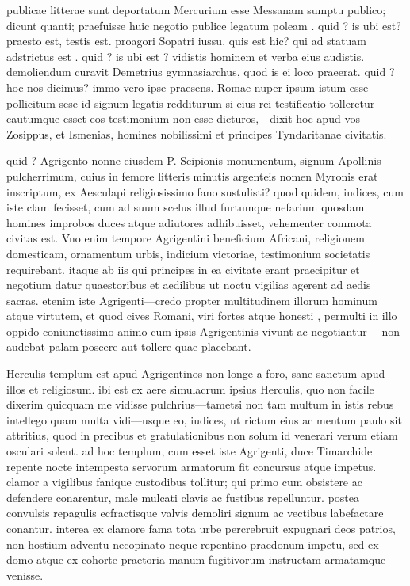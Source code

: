  publicae litterae sunt deportatum Mercurium esse Messanam sumptu publico; dicunt quanti; praefuisse huic negotio publice legatum poleam . quid ? is ubi est? praesto est, testis est. proagori Sopatri iussu. quis est hic? qui ad statuam adstrictus est . quid ? is ubi est ? vidistis hominem et verba eius audistis. demoliendum curavit Demetrius gymnasiarchus, quod is ei loco praeerat. quid ? hoc nos dicimus? immo vero ipse praesens. Romae nuper ipsum istum esse pollicitum sese id signum legatis redditurum si eius rei testificatio tolleretur cautumque esset eos testimonium non esse dicturos,—dixit hoc apud vos Zosippus, et Ismenias, homines nobilissimi et principes Tyndaritanae civitatis.

 quid ? Agrigento nonne eiusdem P. Scipionis monumentum, signum Apollinis pulcherrimum, cuius in femore litteris minutis argenteis nomen Myronis erat inscriptum, ex Aesculapi religiosissimo fano sustulisti? quod quidem, iudices, cum iste clam fecisset, cum ad suum scelus illud furtumque nefarium quosdam homines improbos duces atque adiutores adhibuisset, vehementer commota civitas est. Vno enim tempore Agrigentini beneficium Africani, religionem domesticam, ornamentum urbis, indicium victoriae, testimonium societatis requirebant. itaque ab iis qui principes in ea civitate erant praecipitur et negotium datur quaestoribus et aedilibus ut noctu vigilias agerent ad aedis sacras. etenim iste Agrigenti—credo propter multitudinem illorum hominum atque virtutem, et quod cives Romani, viri fortes atque honesti , permulti in illo oppido coniunctissimo animo cum ipsis Agrigentinis vivunt ac negotiantur —non audebat palam poscere aut tollere quae placebant.

 Herculis templum est apud Agrigentinos non longe a foro, sane sanctum apud illos et religiosum. ibi est ex aere simulacrum ipsius Herculis, quo non facile dixerim quicquam me vidisse pulchrius—tametsi non tam multum in istis rebus intellego quam multa vidi—usque eo, iudices, ut rictum eius ac mentum paulo sit attritius, quod in precibus et gratulationibus non solum id venerari verum etiam osculari solent. ad hoc templum, cum esset iste Agrigenti, duce Timarchide repente nocte intempesta servorum armatorum fit concursus atque impetus. clamor a vigilibus fanique custodibus tollitur; qui primo cum obsistere ac defendere conarentur, male mulcati clavis ac fustibus repelluntur. postea convulsis repagulis ecfractisque valvis demoliri signum ac vectibus labefactare conantur. interea ex clamore fama tota urbe percrebruit expugnari deos patrios, non hostium adventu necopinato neque repentino praedonum impetu, sed ex domo atque ex cohorte praetoria manum fugitivorum instructam armatamque venisse.

